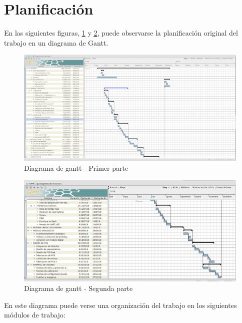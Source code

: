 \section{Planificación}

En las siguientes figuras, \ref{fig:gantt1} y \ref{fig:gantt2}, puede observarse la planificación original del trabajo en un diagrama de Gantt. 

\begin{figure}[!htbp]
	\centering
	\includegraphics[width=\textwidth]{./Figures/gantt1.png}
	\caption{Diagrama de gantt - Primer parte}
	\label{fig:gantt1}
\end{figure}

\begin{figure}[!htbp]
	\centering
	\includegraphics[width=\textwidth]{./Figures/gantt2.png}
	\caption{Diagrama de gantt - Segunda parte}
	\label{fig:gantt2}
\end{figure}

En este diagrama puede verse una organización del trabajo en los siguientes módulos de trabajo:

